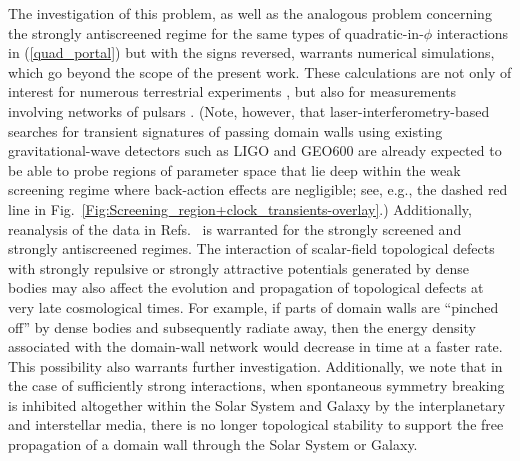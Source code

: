 \documentclass[aps,prd,onecolumn,nofootinbib]{revtex4-2} %
\begin{document}
The investigation of this problem, as well as the analogous problem concerning the strongly antiscreened regime for the same types of quadratic-in-$\phi$ interactions in (\ref{quad_portal}) but with the signs reversed, warrants numerical simulations, which go beyond the scope of the present work. 
These calculations are not only of interest for numerous terrestrial experiments \cite{Derevianko_2014_TDM-clocks,Stadnik_2015_DM-LIFO,Stadnik_2016_DM-cavities,Stadnik_2019_DM-LIFO,Wcislo_2016_TDM-cavity,Roberts_2017_TDM-GPS,Wcislo_2018_TDM-cavity,Roberts_2019_TDM-clocks}, but also for measurements involving networks of pulsars \cite{Stadnik_2014_TDM-pulsars}. 
(Note, however, that laser-interferometry-based searches for transient signatures of passing domain walls using existing gravitational-wave detectors such as LIGO and GEO600 \cite{Stadnik_2019_DM-LIFO} are already expected to be able to probe regions of parameter space that lie deep within the weak screening regime where back-action effects are negligible; see, e.g., the dashed red line in Fig.~\ref{Fig:Screening_region+clock_transients-overlay}.) 
Additionally, reanalysis of the data in Refs.~\cite{Wcislo_2016_TDM-cavity,Roberts_2017_TDM-GPS,Wcislo_2018_TDM-cavity,Roberts_2019_TDM-clocks} is warranted for the strongly screened and strongly antiscreened regimes. 
The interaction of scalar-field topological defects with strongly repulsive or strongly attractive potentials generated by dense bodies may also affect the evolution and propagation of topological defects at very late cosmological times. 
For example, if parts of domain walls are ``pinched off'' by dense bodies and subsequently radiate away, then the energy density associated with the domain-wall network would decrease in time at a faster rate. 
This possibility also warrants further investigation. 
Additionally, we note that in the case of sufficiently strong interactions, when spontaneous symmetry breaking is inhibited altogether within the Solar System and Galaxy by the interplanetary and interstellar media, there is no longer topological stability to support the free propagation of a domain wall through the Solar System or Galaxy. 
\end{document}
